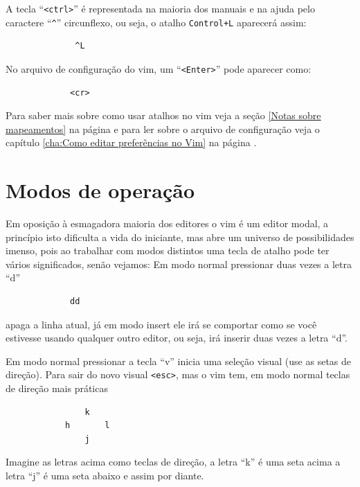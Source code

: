 \documentclass[10pt,a4paper,openany]{book}
\begin{document}
A tecla ``\verb|<ctrl>|'' é representada na maioria dos manuais e na ajuda
pelo caractere ``\verb|^|'' circunflexo, ou seja, o atalho \verb|Control+L| aparecerá assim:

\begin{verbatim}
			  ^L
\end{verbatim}

No arquivo de configuração do vim, um ``\verb|<Enter>|'' pode aparecer como:

\begin{verbatim}
			 <cr>
\end{verbatim}

Para saber mais sobre como usar atalhos no vim veja a seção \ref{Notas sobre
mapeamentos} na página \pageref{Notas sobre mapeamentos} e para ler sobre o
arquivo de configuração veja o capítulo \ref{cha:Como editar preferências no Vim} na página
\pageref{cha:Como editar preferências no Vim}.


\section{Modos de operação}\label{Modos de operação}

Em oposição à esmagadora maioria dos editores o vim é um editor modal, a
princípio isto dificulta a vida do iniciante, mas abre um universo de
possibilidades imenso, pois ao trabalhar com modos distintos uma tecla de
atalho pode ter vários significados, senão vejamos:
Em modo normal pressionar duas vezes a letra ``d''
\begin{verbatim}
			 dd
\end{verbatim}
apaga a linha atual, já em modo insert ele irá se comportar como se você estivesse
usando qualquer outro editor, ou seja, irá inserir duas vezes a letra ``d''.

Em modo normal pressionar a tecla ``v'' inicia uma seleção visual (use as setas de direção).
Para sair do novo visual \verb|<esc>|, mas o vim tem, em modo normal teclas de direção mais práticas

\begin{verbatim}
				k
			h		l
				j
\end{verbatim}

Imagine as letras acima como teclas de direção, a letra ``k'' é uma seta acima
a letra ``j'' é uma seta abaixo e assim por diante.

\end{document}
